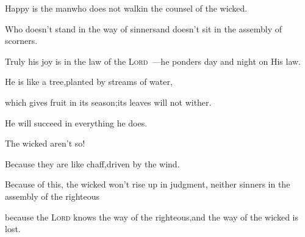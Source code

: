 
\begin{inparaenum}
  \pa {} Happy is the man\pa who does not walk\pa in the counsel of the wicked.%
  
  \pb Who doesn't stand in the way of sinners\pa and doesn't sit in the assembly of scorners.%
  
  \pa {} Truly his joy is in the law of the \textsc{Lord}~---\pa he ponders%
  day and night on His law.%
  
  \pa {} He is like a tree,\pa planted by streams of water,%
  
  \pb which gives fruit in its season;\pa its leaves will not wither.%
  
  \pb He will succeed in everything he does.%
  
  \pb {} The wicked aren't so!%
  
  \pb Because they are like chaff,\pa driven by the wind.%
  
  \pa {} Because of this, the wicked won't rise up in judgment,%
  \pa neither sinners in the assembly%
  of the righteous%
  
  \pa {} because the \textsc{Lord} knows the way of the righteous,\pa and the way of the wicked is lost.%
\end{inparaenum}
